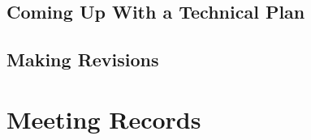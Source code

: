 \documentclass[a4paper, 12pt]{extreport}
\begin{document}
		\section{Coming Up With a Technical Plan}
		
		\section{Making Revisions}
		
	\nocite{*}
	\printbibliography[heading={bibnumbered}, title={Bibliography}]
	
	\chapter{Meeting Records}
		
		
		
		
		
\end{document}
